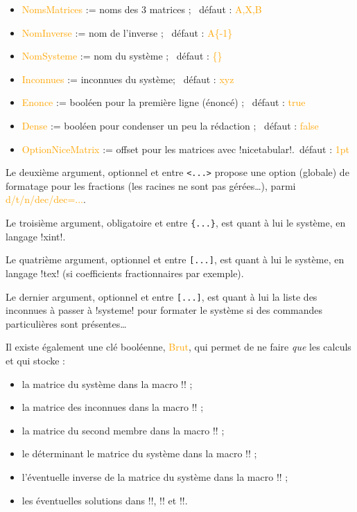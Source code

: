 \documentclass[french,a4paper,11pt]{article}
\newcommand\Cle[1]{{\small\sffamily\textlangle \textcolor{orange}{#1}\textrangle}}
\begin{document}
{{\begin{tipblock}
\begin{itemize}
	\item \Cle{NomsMatrices} := noms des 3 matrices ; \hfill~défaut : \Cle{A,X,B}
	\item \Cle{NomInverse} := nom de l'inverse ; \hfill~défaut : \Cle{A\{-1\}}
	\item \Cle{NomSysteme} := nom du système ; \hfill~défaut : \Cle{\{\}}
	\item \Cle{Inconnues} := inconnues du système; \hfill~défaut : \Cle{xyz}
	\item \Cle{Enonce} := booléen pour la première ligne (énoncé) ; \hfill~défaut : \Cle{true}
	\item \Cle{Dense} := booléen pour condenser un peu la rédaction ; \hfill~défaut : \Cle{false}
	\item \Cle{OptionNiceMatrix} := offset pour les matrices avec \motcletex!nicetabular!.\hfill~défaut : \Cle{1pt}
\end{itemize}

Le deuxième argument, optionnel et entre \texttt{<...>} propose une option (globale) de formatage pour les fractions (les racines ne sont pas gérées\ldots), parmi \Cle{d/t/n/dec/dec=...}.

\smallskip

Le troisième argument, obligatoire et entre \texttt{\{...\}}, est quant à lui le système, en langage \motcletex!xint!.

\smallskip

Le quatrième argument, optionnel et entre \texttt{[...]}, est quant à lui le système, en langage \motcletex!tex! (si coefficients fractionnaires par exemple).

\smallskip

Le dernier argument, optionnel et entre \texttt{[...]}, est quant à lui la liste des inconnues à passer à \motcletex!systeme! pour formater le système si des commandes particulières sont présentes\ldots
\end{tipblock}

\begin{tipblock}
Il existe également une clé booléenne, \Cle{Brut}, qui permet de ne faire \textit{que} les calculs et qui stocke :

\begin{itemize}
	\item la matrice du système dans la macro \motcletex!\ResolMatA! ;
	\item la matrice des inconnues dans la macro \motcletex!\ResolMatX! ;
	\item la matrice du second membre dans la macro \motcletex!\ResolMatB! ;
	\item le déterminant le matrice du système dans la macro \motcletex!\ResolDet! ;
	\item l'éventuelle inverse de la matrice du système dans la macro \motcletex!\ResolInvMatA! ;
	\item les éventuelles solutions dans \motcletex!\ResolSolX!, \motcletex!\ResolSolY! et \motcletex!\ResolSolZ!.
\end{itemize}
\vspace*{-\baselineskip}\leavevmode
\end{tipblock}

}}
\end{document}
